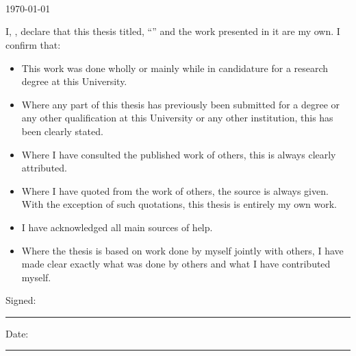 \documentclass[
11pt, %
english, %
singlespacing, %
headsepline, %
openany,
]{MastersDoctoralThesis} %
\begin{document}
\begin{titlepage}
\begin{center}
\vfill

\large \textit{\degreename}\\[0.3cm] %
\textit{}\\[0.4cm]
\groupname\\[2cm] %

\vfill

{\large \today}\\[4cm] %

\vfill
\end{center}
\end{titlepage}


\begin{declaration}
\addchaptertocentry{\authorshipname} %
\noindent I, \authorname, declare that this thesis titled, \enquote{\ttitle} and the work presented in it are my own. I confirm that:

\begin{itemize}
\item This work was done wholly or mainly while in candidature for a research degree at this University.
\item Where any part of this thesis has previously been submitted for a degree or any other qualification at this University or any other institution, this has been clearly stated.
\item Where I have consulted the published work of others, this is always clearly attributed.
\item Where I have quoted from the work of others, the source is always given. With the exception of such quotations, this thesis is entirely my own work.
\item I have acknowledged all main sources of help.
\item Where the thesis is based on work done by myself jointly with others, I have made clear exactly what was done by others and what I have contributed myself.\\
\end{itemize}

\noindent Signed:\\
\rule[0.5em]{25em}{0.5pt} %

\noindent Date:\\
\rule[0.5em]{25em}{0.5pt} %
\end{declaration}
\end{document}
